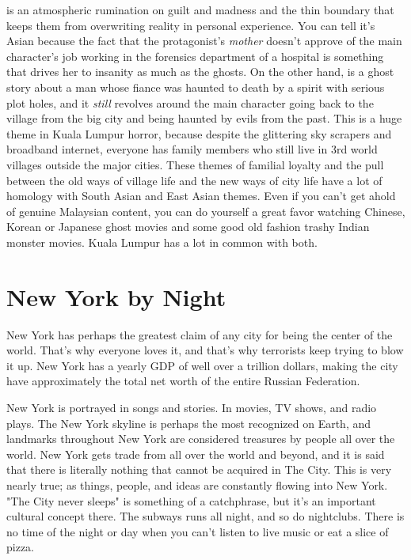  is an atmospheric rumination on guilt and madness and the thin boundary that keeps them from overwriting reality in personal experience. You can tell it's Asian because the fact that the protagonist's \textit{mother} doesn't approve of the main character's job working in the forensics department of a hospital is something that drives her to insanity as much as the ghosts. On the other hand,  is a ghost story about a man whose fiance was haunted to death by a spirit with serious plot holes, and it \textit{still} revolves around the main character going back to the village from the big city and being haunted by evils from the past. This is a huge theme in Kuala Lumpur horror, because despite the glittering sky scrapers and broadband internet, everyone has family members who still live in 3rd world villages outside the major cities. These themes of familial loyalty and the pull between the old ways of village life and the new ways of city life have a lot of homology with South Asian and East Asian themes. Even if you can't get ahold of genuine Malaysian content, you can do yourself a great favor watching Chinese, Korean or Japanese ghost movies and some good old fashion trashy Indian monster movies. Kuala Lumpur has a lot in common with both.

\section{New York by Night}

New York has perhaps the greatest claim of any city for being the center of the world. That's why everyone loves it, and that's why terrorists keep trying to blow it up. New York has a yearly GDP of well over a trillion dollars, making the city have approximately the total net worth of the entire Russian Federation.

New York is portrayed in songs and stories. In movies, TV shows, and radio plays. The New York skyline is perhaps the most recognized on Earth, and landmarks throughout New York are considered treasures by people all over the world. New York gets trade from all over the world and beyond, and it is said that there is literally nothing that cannot be acquired in The City. This is very nearly true; as things, people, and ideas are constantly flowing into New York. "The City never sleeps" is something of a catchphrase, but it's an important cultural concept there. The subways runs all night, and so do nightclubs. There is no time of the night or day when you can't listen to live music or eat a slice of pizza.

